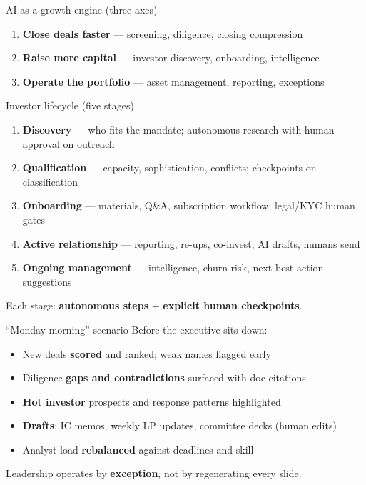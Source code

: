 \documentclass[aspectratio=169,11pt]{beamer}
\begin{document}
\begin{frame}{AI as a growth engine (three axes)}
  \begin{enumerate}
    \item \textbf{Close deals faster} --- screening, diligence, closing compression
    \item \textbf{Raise more capital} --- investor discovery, onboarding, intelligence
    \item \textbf{Operate the portfolio} --- asset management, reporting, exceptions
  \end{enumerate}
\end{frame}

\begin{frame}{Investor lifecycle (five stages)}
  \small
  \begin{enumerate}
    \item \textbf{Discovery} --- who fits the mandate; autonomous research with human approval on outreach
    \item \textbf{Qualification} --- capacity, sophistication, conflicts; checkpoints on classification
    \item \textbf{Onboarding} --- materials, Q\&A, subscription workflow; legal/KYC human gates
    \item \textbf{Active relationship} --- reporting, re-ups, co-invest; AI drafts, humans send
    \item \textbf{Ongoing management} --- intelligence, churn risk, next-best-action suggestions
  \end{enumerate}
  \vspace{0.3em}
  Each stage: \textbf{autonomous steps} + \textbf{explicit human checkpoints}.
\end{frame}

\begin{frame}{``Monday morning'' scenario}
  \small
  Before the executive sits down:
  \begin{itemize}\itemsep3pt
    \item New deals \textbf{scored} and ranked; weak names flagged early
    \item Diligence \textbf{gaps and contradictions} surfaced with doc citations
    \item \textbf{Hot investor} prospects and response patterns highlighted
    \item \textbf{Drafts}: IC memos, weekly LP updates, committee decks (human edits)
    \item Analyst load \textbf{rebalanced} against deadlines and skill
  \end{itemize}
  Leadership operates by \textbf{exception}, not by regenerating every slide.
\end{frame}
\end{document}
